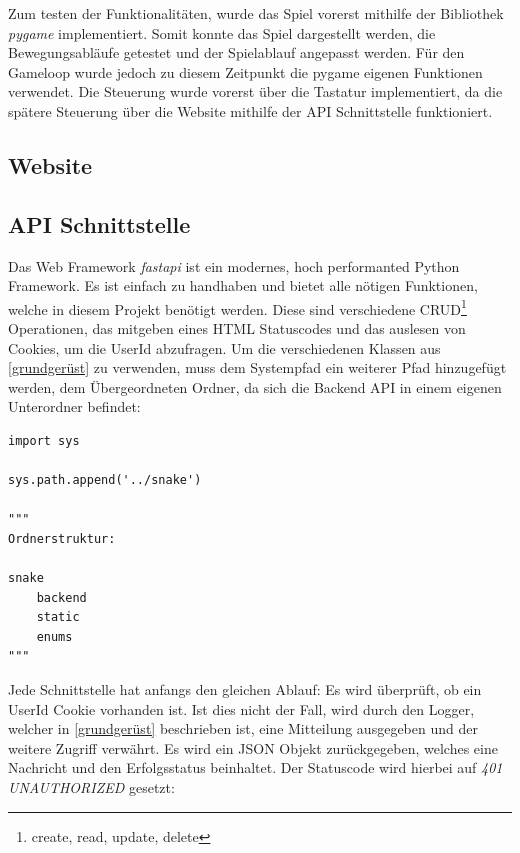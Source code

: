 \documentclass[a4paper,12pt]{scrartcl}
\begin{document}
Zum testen der Funktionalitäten, wurde das Spiel vorerst mithilfe der Bibliothek \textit{pygame} implementiert. Somit konnte das Spiel dargestellt werden, die Bewegungsabläufe getestet und der Spielablauf angepasst werden. Für den Gameloop wurde jedoch zu diesem Zeitpunkt die pygame eigenen Funktionen verwendet. Die Steuerung wurde vorerst über die Tastatur implementiert, da die spätere Steuerung über die Website mithilfe der API Schnittstelle funktioniert.

\subsection{Website}

\subsection{API Schnittstelle}

Das Web Framework \textit{fastapi} ist ein modernes, hoch performanted Python Framework. Es ist einfach zu handhaben und bietet alle nötigen Funktionen, welche in diesem Projekt benötigt werden. Diese sind verschiedene CRUD\footnote{create, read, update, delete} Operationen, das mitgeben eines HTML Statuscodes und das auslesen von Cookies, um die UserId abzufragen. Um die verschiedenen Klassen aus \autoref{grundgerüst} zu verwenden, muss dem Systempfad ein weiterer Pfad hinzugefügt werden, dem Übergeordneten Ordner, da sich die Backend API in einem eigenen Unterordner befindet:

\begin{lstlisting}
import sys

sys.path.append('../snake')

"""
Ordnerstruktur:

snake
	backend
	static
	enums
"""
\end{lstlisting}

Jede Schnittstelle hat anfangs den gleichen Ablauf: Es wird überprüft, ob ein UserId Cookie vorhanden ist. Ist dies nicht der Fall, wird durch den Logger, welcher in \autoref{grundgerüst} beschrieben ist, eine Mitteilung ausgegeben und der weitere Zugriff verwährt. Es wird ein JSON Objekt zurückgegeben, welches eine Nachricht und den Erfolgsstatus beinhaltet. Der Statuscode wird hierbei auf \textit{401 UNAUTHORIZED} gesetzt:
\end{document}
